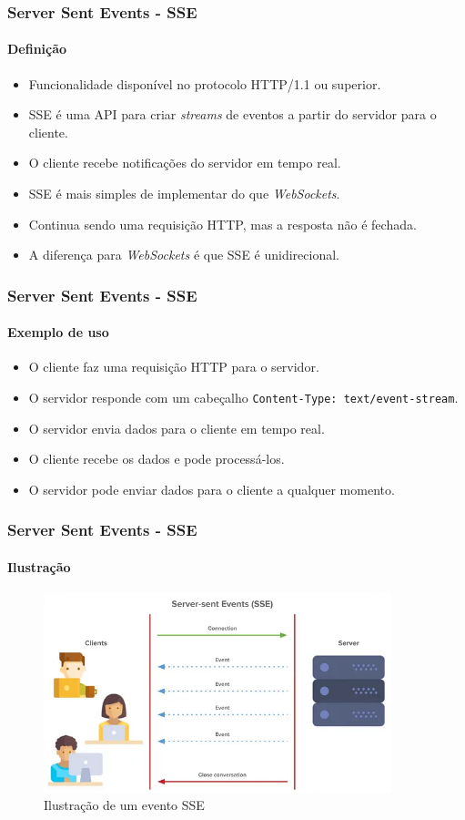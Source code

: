 \documentclass[
	9pt, %
	t, %
]{beamer}
\newcommand{\yellowbox}[1]{\colorbox{yellow!75}{#1}}
\begin{document}
\begin{frame}
	\frametitle{Server Sent Events - SSE}
	\framesubtitle{Definição}

	\begin{itemize}
		\item Funcionalidade disponível no protocolo HTTP/1.1 ou superior.
		\item SSE é uma API para criar \textit{streams} de eventos \yellowbox{a partir do servidor} para o cliente.
		\item O cliente recebe notificações do servidor em \yellowbox{tempo real}.
		\item SSE é mais simples de implementar do que \textit{WebSockets}.
		\item Continua sendo uma requisição HTTP, mas a resposta não é fechada.
		\item A diferença para \textit{WebSockets} é que SSE é \yellowbox{unidirecional}.
	\end{itemize}

\end{frame}

\begin{frame}
	\frametitle{Server Sent Events - SSE}
	\framesubtitle{Exemplo de uso}

	\begin{itemize}
		\item O cliente faz uma requisição HTTP para o servidor.
		\item O servidor responde com um cabeçalho \texttt{Content-Type: text/event-stream}.
		\item O servidor envia dados para o cliente \yellowbox{em tempo real}.
		\item O cliente recebe os dados e pode processá-los.
		\item O servidor pode enviar dados para o cliente \yellowbox{a qualquer momento}.
	\end{itemize}

\end{frame}

\begin{frame}
	\frametitle{Server Sent Events - SSE}
	\framesubtitle{Ilustração}

	\begin{figure}
		\centering
		\includegraphics[width=0.9\textwidth]{sse.png}
		\caption{Ilustração de um evento SSE}
	\end{figure}

\end{frame}
\end{document}
